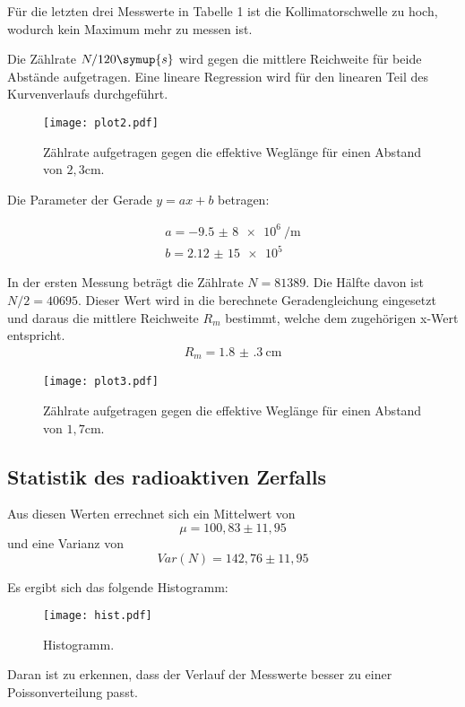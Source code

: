 Für die letzten drei Messwerte in Tabelle 1 ist die Kollimatorschwelle zu hoch, wodurch kein Maximum mehr zu messen ist.

Die Zählrate $N/120\symup{s}$ wird gegen die mittlere Reichweite für beide Abstände aufgetragen. Eine lineare Regression wird für den linearen Teil
des Kurvenverlaufs durchgeführt.

\begin{figure}[H]
  \centering
  \texttt{[image: plot2.pdf]}
  \caption{Zählrate aufgetragen gegen die effektive Weglänge für einen Abstand von $2,3$cm.}
  \label{fig:plot}
\end{figure}


Die Parameter der Gerade $y=ax + b$ betragen:

\begin{align*}
  a = \SI{-9,5(8)e6}{\per\meter} \\
  b = \SI{2,12(15)e5}
\end{align*}

In der ersten Messung beträgt die Zählrate $N =81389$. Die Hälfte davon ist $N/2 = 40695$. Dieser Wert wird in die berechnete Geradengleichung eingesetzt und
daraus die mittlere Reichweite $R_m$ bestimmt, welche dem zugehörigen x-Wert entspricht.
\begin{align*}
  R_m = \SI{1.8(3)}{\centi\meter}
\end{align*}


\begin{figure}
  \centering
  \texttt{[image: plot3.pdf]}
  \caption{Zählrate aufgetragen gegen die effektive Weglänge für einen Abstand von $1,7$cm.}
  \label{fig:plot}
\end{figure}





\subsection{Statistik des radioaktiven Zerfalls}
Aus diesen Werten errechnet sich ein Mittelwert von
\begin{equation*}
  \mu = 100,83 \pm 11,95
\end{equation*}
und eine Varianz von
\begin{equation*}
  Var(N) = 142,76 \pm 11,95
\end{equation*}

Es ergibt sich das folgende Histogramm:
\begin{figure}[H]
  \centering
  \texttt{[image: hist.pdf]}
  \caption{Histogramm.}
  \label{fig:hist}
\end{figure}

Daran ist zu erkennen, dass der Verlauf der Messwerte besser zu einer Poissonverteilung passt.
